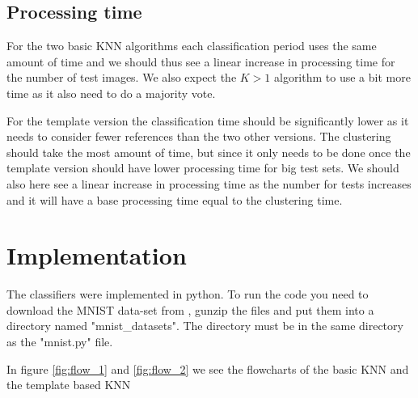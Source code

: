 \documentclass{article}
\begin{document}
\subsection{Processing time}
For the two basic KNN algorithms each classification period uses the same amount of time and we should thus see a linear increase in processing time for the number of test images. We also expect the $K > 1$ algorithm to use a bit more time as it also need to do a majority vote.

For the template version the classification time should be significantly lower as it needs to consider fewer references than the two other versions. The clustering should take the most amount of time, but since it only needs to be done once the template version should have lower processing time for big test sets. We should also here see a linear increase in processing time as the number for tests increases and it will have a base processing time equal to the clustering time. 


\section{Implementation}
The classifiers were implemented in python. To run the code you need to download the MNIST data-set from \cite{MNIST}, gunzip the files and put them into a directory named "mnist\_datasets". The directory must be in the same directory as the "mnist.py" file.


In figure \ref{fig:flow_1} and \ref{fig:flow_2} we see the flowcharts of the basic KNN and the template based KNN
\end{document}
